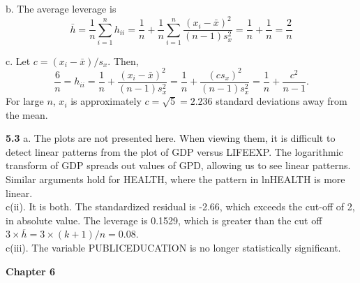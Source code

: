 b. The average leverage is
\begin{equation*}
\bar{h}=\frac{1}{n} \sum_{i=1}^n h_{ii} =
\frac{1}{n}+\frac{1}{n}\sum_{i=1}^n\frac{(x_i-\bar{x})^2}{(n-1)s_{x}^2}=\frac{1}{n}+\frac{1}{n}=\frac{2}{n}
\end{equation*}

c. Let $c = (x_i-\bar{x})/s_x$. Then,
\begin{equation*}
\frac{6}{n}=h_{ii}=\frac{1}{n}+\frac{(x_i-\bar{x})^2}{(n-1)s_{x}^2}=
\frac{1}{n}+\frac{(cs_x)^2}{(n-1)s_{x}^2}=\frac{1}{n}+\frac{c^2}{n-1}
.
\end{equation*}
For large $n$, $x_i$ is approximately $c=\sqrt{5}=2.236$ standard
deviations away from the mean.


\textbf{5.3} a. The plots are not presented here. When viewing them,
it is difficult to detect linear patterns from the plot of GDP
versus LIFEEXP. The logarithmic transform of GDP spreads out values
of GPD, allowing us to see linear patterns. Similar arguments hold
for HEALTH, where the pattern in lnHEALTH is more linear.\\
c(ii). It is both. The standardized residual is -2.66, which exceeds
the cut-off of 2, in absolute value. The leverage is 0.1529, which
is greater than the cut off $3 \times\overline{h} =3\times (k+1)/n =
0.08$. \\
c(iii). The variable PUBLICEDUCATION is no longer statistically
significant.

\begin{center}\large \textbf{Chapter 6}\end{center}

